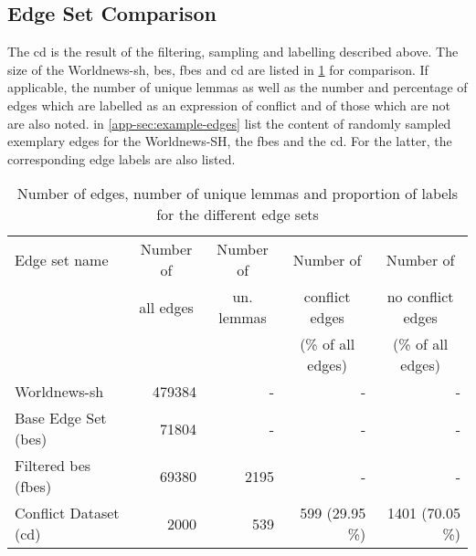 \documentclass[11pt, numbers=noenddot]{scrreprt}
\begin{document}

\subsection{Edge Set Comparison}
The \gls{cd} is the result of the filtering, sampling and labelling described above. The size of the Worldnews-\gls{sh}, \gls{bes}, \gls{fbes} and \gls{cd} are listed in \cref{tab:dataset-descriptions} for comparison. If applicable, the number of unique lemmas as well as the number and percentage of edges which are labelled as an expression of conflict and of those which are not are also noted.  in \cref{app-sec:example-edges} list the content of randomly sampled exemplary edges for the Worldnews-SH, the \gls{fbes} and the \gls{cd}. For the latter, the corresponding edge labels are also listed.


\begin{table}
\centering
\begin{tabular}{lrrrr}
\toprule
\multicolumn{1}{l}{Edge set name}	& \multicolumn{1}{c}{Number of} & \multicolumn{1}{c}{Number of}		& \multicolumn{1}{c}{Number of} 		& \multicolumn{1}{c}{Number of} \\
\multicolumn{1}{l}{} 				& \multicolumn{1}{c}{all edges} & \multicolumn{1}{c}{un. lemmas}			& \multicolumn{1}{c}{conflict edges} 	& \multicolumn{1}{c}{no conflict edges} \\
\multicolumn{1}{l}{} 				& \multicolumn{1}{c}{} 			& \multicolumn{1}{c}{}				& \multicolumn{1}{c}{(\% of all edges)} & \multicolumn{1}{c}{(\% of all edges)} \\
\midrule
Worldnews-\gls{sh}						& 479384		& -			& -					& - \\
Base Edge Set (\gls{bes})					& 71804		& -			& -					& - \\
Filtered \gls{bes} (\gls{fbes})					& 69380 		& 2195 		& - 					& - \\
Conflict Dataset (\gls{cd})				& 2000 		& 539 		& 599 (29.95 \%) 	& 1401 (70.05 \%) \\
\bottomrule
\end{tabular}
\caption{Number of edges, number of unique lemmas and proportion of labels for the different edge sets}
\label{tab:dataset-descriptions}
\end{table}
\end{document}
